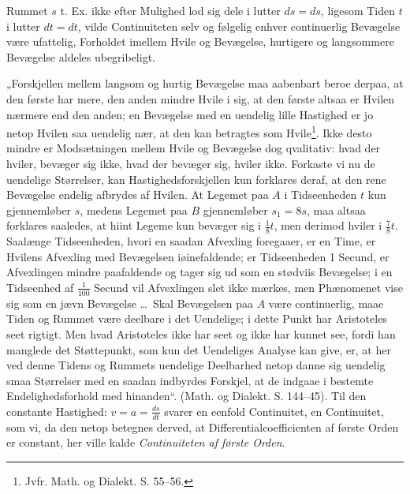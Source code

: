 \documentclass[12pt,a4paper]{book}
\begin{document}
Rummet $s$ t. Ex. ikke efter Mulighed lod sig dele i lutter
$ds = ds$, ligesom Tiden $t$ i lutter $dt = dt$, vilde
Continuiteten selv og følgelig enhver continuerlig Bevægelse
være ufattelig, Forholdet imellem Hvile og Bevægelse,
hurtigere og langsommere Bevægelse aldeles ubegribeligt.

„Forskjellen mellem langsom og hurtig Bevægelse maa
aabenbart beroe derpaa, at den første har mere, den anden
\setcounter{footnote}{0}
mindre Hvile i sig, at den første altsaa er Hvilen nærmere
end den anden; en Bevægelse med en uendelig lille Hastighed
er jo netop Hvilen saa uendelig nær, at den kan betragtes
som Hvile\footnote{Jvfr. Math. og Dialekt. S. 55--56.}. Ikke
desto mindre er Modsætningen mellem
Hvile og Bevægelse dog qvalitativ: hvad der hviler, bevæger
sig ikke, hvad der bevæger sig, hviler ikke. Forkaste vi nu
de uendelige Størrelser, kan Hastighedsforskjellen kun forklares
deraf, at den rene Bevægelse endelig afbrydes af Hvilen. At
Legemet paa $A$ i Tidseenheden $t$ kun gjennemløber $s$, medens
Legemet paa $B$ gjennemløber $s_1 = 8s$, maa altsaa forklares
saaledes, at hiint Legeme kun bevæger sig i $\frac{1}{8}t$, men
derimod hviler i $\frac{7}{8}t$. Saalænge Tidseenheden, hvori
en saadan Afvexling foregaaer, er en Time, er Hvilens Afvexling
med Bevægelsen iøinefaldende; er Tidseenheden 1 Secund, er
Afvexlingen mindre paafaldende og tager sig ud som en stødviis
Bevægelse; i en Tidseenhed af $\frac{1}{100}$ Secund vil
Afvexlingen slet ikke mærkes, men Phænomenet vise sig som en
jævn Bevægelse \ldots\ Skal Bevægelsen paa $A$ være
continuerlig, maae Tiden og Rummet være deelbare i det
Uendelige; i dette Punkt har Aristoteles seet rigtigt. Men hvad
Aristoteles ikke har seet og ikke har kunnet see, fordi han
manglede det Støttepunkt, som kun det Uendeliges Analyse
kan give, er, at her ved denne Tidens og Rummets uendelige
Deelbarhed netop danne sig uendelig smaa Størrelser med
en saadan indbyrdes Forskjel, at de indgaae i bestemte
Endelighedsforhold med hinanden“. (Math. og Dialekt. S. 144--45).
Til den constante Hastighed: $v = a = \frac{ds}{dt}$ svarer en
eenfold Continuitet, en Continuitet, som vi, da den netop betegnes
derved, at Differentialcoefficienten af første Orden er constant,
her ville kalde \emph{Continuiteten af første Orden}.
\end{document}
